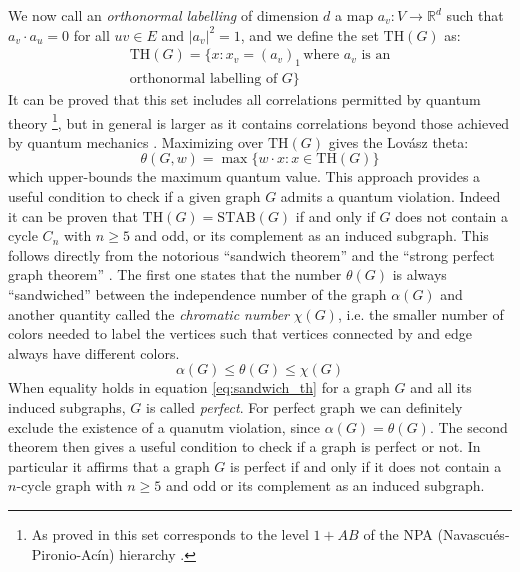 \documentclass[letterpaper]{article}
\newcommand{\Real}{\mathbb{R}}
\newcommand{\STAB}{\mathrm{STAB}}
\renewcommand{\TH}{\mathrm{TH}}
\begin{document}
We now call an \emph{orthonormal labelling} of dimension $d$ a map
$a_v:V \rightarrow \Real^d$ such that $a_v \cdot a_u = 0$ for all $uv \in E$ and
$|a_v|^2 = 1$, and we define the set $\TH(G)$ as:
\begin{multline}
    \TH(G) = \{x: x_v = (a_v)_1 \, \text{where $a_v$ is an} \\ \text{orthonormal labelling of $G$}\}
    \label{eq:thbody}
\end{multline}
It can be proved that this set includes all correlations permitted by quantum
theory \footnote{As proved in \cite{acin2015} this set corresponds to the level
$1+AB$ of the NPA (Navascués-Pironio-Acín) hierarchy \cite{npa2008}.}, 
but in general is larger as it contains correlations beyond those achieved by quantum
mechanics \cite{almostquantum2015}.
Maximizing over $\TH(G)$ gives the Lovász theta:
\begin{equation}
    \theta(G,w) = \max \{w\cdot x : x \in \TH(G)\}
    \label{eq:lovasztheta}
\end{equation}
which upper-bounds the maximum quantum value.
This approach provides a useful condition to check if a given graph $G$ admits a
quantum violation. Indeed it can be proven that $\TH(G) = \STAB(G)$ if and only
if $G$ does not contain a cycle $C_n$ with $n \ge 5$ and odd, or its complement
as an induced subgraph. 
This follows directly from the notorious ``sandwich theorem''\cite{knuth, lovasz} and the ``strong
perfect graph theorem'' \cite{spgth}.
The first one states that the number $\theta(G)$ is always ``sandwiched''
between the independence number of the graph $\alpha(G)$ and another quantity
called the \emph{chromatic number} $\chi(G)$, i.e. the smaller number of colors needed
to label the vertices such that vertices connected by and edge always have
different colors.
\begin{equation}
    \alpha(G) \le \theta(G) \le \chi(G)
    \label{eq:sandwich_th}
\end{equation}
When equality holds in equation \eqref{eq:sandwich_th} for a graph $G$ and all its
induced subgraphs, $G$ is called \emph{perfect}.
For perfect graph we can definitely exclude the existence of a quanutm
violation, since $\alpha(G) = \theta(G)$.
The second theorem then gives a useful condition to check if a graph is perfect
or not.  In particular it affirms that a graph $G$ is perfect if and only if it
does not contain a $n$-cycle graph with $n\ge5$ and odd or its complement as an
induced subgraph.
\end{document}
